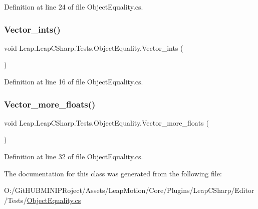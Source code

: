 Definition at line 24 of file Object\+Equality.\+cs.

\mbox{\label{class_leap_1_1_leap_c_sharp_1_1_tests_1_1_object_equality_a08e1f1866ddcb0ce5fea14cbc17a43d0}} 
\subsubsection{\texorpdfstring{Vector\_ints()}{Vector\_ints()}}
{\footnotesize\ttfamily void Leap.\+Leap\+C\+Sharp.\+Tests.\+Object\+Equality.\+Vector\+\_\+ints (\begin{DoxyParamCaption}{ }\end{DoxyParamCaption})}



Definition at line 16 of file Object\+Equality.\+cs.

\mbox{\label{class_leap_1_1_leap_c_sharp_1_1_tests_1_1_object_equality_a171da70f23f5ceb3a8ec713bf161998d}} 
\subsubsection{\texorpdfstring{Vector\_more\_floats()}{Vector\_more\_floats()}}
{\footnotesize\ttfamily void Leap.\+Leap\+C\+Sharp.\+Tests.\+Object\+Equality.\+Vector\+\_\+more\+\_\+floats (\begin{DoxyParamCaption}{ }\end{DoxyParamCaption})}



Definition at line 32 of file Object\+Equality.\+cs.



The documentation for this class was generated from the following file\+:\begin{DoxyCompactItemize}
\item 
O\+:/\+Git\+H\+U\+B\+M\+I\+N\+I\+P\+Roject/\+Assets/\+Leap\+Motion/\+Core/\+Plugins/\+Leap\+C\+Sharp/\+Editor/\+Tests/\mbox{\hyperlink{_object_equality_8cs}{Object\+Equality.\+cs}}\end{DoxyCompactItemize}
